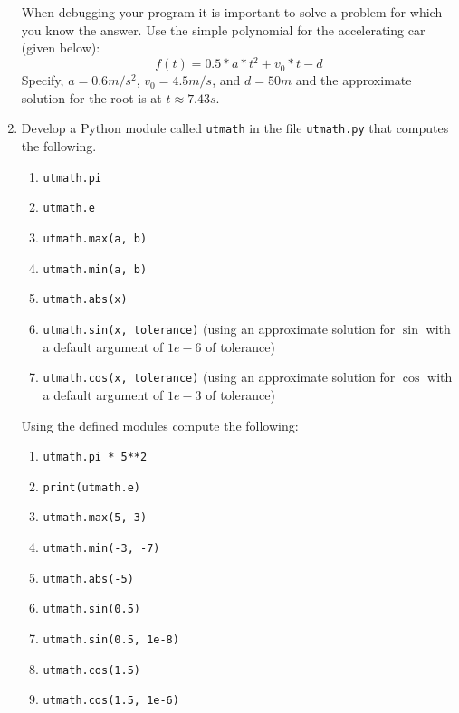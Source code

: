 \documentclass[a4paper,12pt]{article}
\begin{document}
\begin{enumerate}
	When debugging your program it is important to solve a problem for which you know the answer. Use the simple polynomial for the accelerating car (given below):
	\begin{equation*}
	f(t) = 0.5 * a * t^2 + v_0 * t - d
	\end{equation*}
	Specify, $a = 0.6m/s^2$, $v_0 = 4.5 m/s$, and $d=50m$ and the approximate solution for the root is at $t\approx7.43s$.
	
	\item Develop a Python module called \verb|utmath| in the file  \verb|utmath.py| that computes the following.
	\begin{enumerate}
		\item \verb|utmath.pi|
		\item \verb|utmath.e|
		\item \verb|utmath.max(a, b)|
		\item \verb|utmath.min(a, b)|
		\item \verb|utmath.abs(x)|
		\item \verb|utmath.sin(x, tolerance)| (using an approximate solution for $\sin$ with a default argument of $1e-6$ of tolerance)
		\item \verb|utmath.cos(x, tolerance)| (using an approximate solution for $\cos$ with a default argument of $1e-3$ of tolerance)
	\end{enumerate}

	Using the defined modules compute the following:
	
	\begin{enumerate}
		\item \verb|utmath.pi * 5**2|
		\item \verb|print(utmath.e)|
		\item \verb|utmath.max(5, 3)|
		\item \verb|utmath.min(-3, -7)|
		\item \verb|utmath.abs(-5)|
		\item \verb|utmath.sin(0.5)|
		\item \verb|utmath.sin(0.5, 1e-8)|
		\item \verb|utmath.cos(1.5)|
		\item \verb|utmath.cos(1.5, 1e-6)|
	\end{enumerate}

\end{enumerate}
\end{document}
